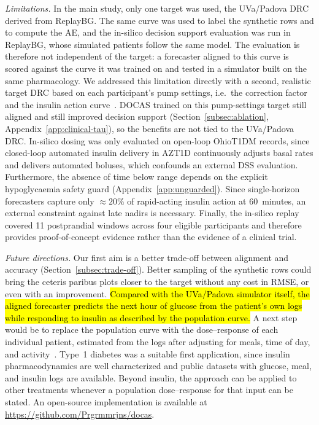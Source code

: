 \documentclass[a4paper,fleqn]{cas-sc}
\begin{document}
\textit{Limitations.}
In the main study, only one target was used, the UVa/Padova DRC derived from ReplayBG. The same curve was used to label the synthetic rows and to compute the AE, and the in-silico decision support evaluation was run in ReplayBG, whose simulated patients follow the same model. The evaluation is therefore not independent of the target: a forecaster aligned to this curve is scored against the curve it was trained on and tested in a simulator built on the same pharmacology. We addressed this limitation directly with a second, realistic target DRC based on each participant's pump settings, i.e.\ the correction factor and the insulin action curve~\citep{walsh2011}. DOCAS trained on this pump-settings target still aligned and still improved decision support (Section~\ref{subsec:ablation}, Appendix~\ref{app:clinical-tau}), so the benefits are not tied to the UVa/Padova DRC. In-silico dosing was only evaluated on open-loop OhioT1DM records, since closed-loop automated insulin delivery in AZT1D continuously adjusts basal rates and delivers automated boluses, which confounds an external DSS evaluation. Furthermore, the absence of time below range depends on the explicit hypoglycaemia safety guard (Appendix~\ref{app:unguarded}). Since single-horizon forecasters capture only $\approx 20\%$ of rapid-acting insulin action at 60~minutes, an external constraint against late nadirs is necessary. Finally, the in-silico replay covered 11 postprandial windows across four eligible participants and therefore provides proof-of-concept evidence rather than the evidence of a clinical trial.

\textit{Future directions.}
Our first aim is a better trade-off between alignment and accuracy (Section~\ref{subsec:trade-off}). Better sampling of the synthetic rows could bring the ceteris paribus plots closer to the target without any cost in RMSE, or even with an improvement. \hl{Compared with the UVa/Padova simulator itself, the aligned forecaster predicts the next hour of glucose from the patient's own logs while responding to insulin as described by the population curve.} A next step would be to replace the population curve with the dose--response of each individual patient, estimated from the logs after adjusting for meals, time of day, and activity~\citep{hinshaw2013,riddell2017,cappon2023,prendin2025dt}. Type~1 diabetes was a suitable first application, since insulin pharmacodynamics are well characterized and public datasets with glucose, meal, and insulin logs are available. Beyond insulin, the approach can be applied to other treatments whenever a population dose--response for that input can be stated. An open-source implementation is available at \url{https://github.com/Prgrmmrjns/docas}.
\end{document}
